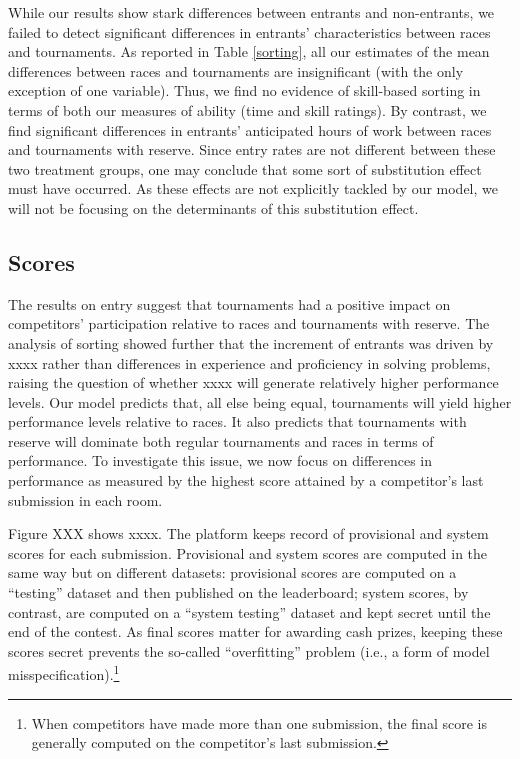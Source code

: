 \documentclass[10pt, titlepage]{article}
\begin{document}
While our results show stark differences between entrants and
non-entrants, we failed to detect significant differences in entrants'
characteristics between races and tournaments. As reported in Table
\ref{sorting}, all our estimates of the mean differences between races
and tournaments are insignificant (with the only exception of one
variable). Thus, we find no evidence of skill-based sorting in terms of
both our measures of ability (time and skill ratings). By contrast, we
find significant differences in entrants' anticipated hours of work
between races and tournaments with reserve. Since entry rates are not
different between these two treatment groups, one may conclude that some
sort of substitution effect must have occurred. As these effects are not
explicitly tackled by our model, we will not be focusing on the
determinants of this substitution effect.

\subsection{Scores}\label{scores}

The results on entry suggest that tournaments had a positive impact on
competitors' participation relative to races and tournaments with
reserve. The analysis of sorting showed further that the increment of
entrants was driven by xxxx rather than differences in experience and
proficiency in solving problems, raising the question of whether xxxx
will generate relatively higher performance levels. Our model predicts
that, all else being equal, tournaments will yield higher performance
levels relative to races. It also predicts that tournaments with reserve
will dominate both regular tournaments and races in terms of
performance. To investigate this issue, we now focus on differences in
performance as measured by the highest score attained by a competitor's
last submission in each room.

Figure XXX shows xxxx. The platform keeps record of provisional and
system scores for each submission. Provisional and system scores are
computed in the same way but on different datasets: provisional scores
are computed on a ``testing'' dataset and then published on the
leaderboard; system scores, by contrast, are computed on a ``system
testing'' dataset and kept secret until the end of the contest. As final
scores matter for awarding cash prizes, keeping these scores secret
prevents the so-called ``overfitting'' problem (i.e., a form of model
misspecification).\footnote{When competitors have made more than one
  submission, the final score is generally computed on the competitor's
  last submission.}
\end{document}
